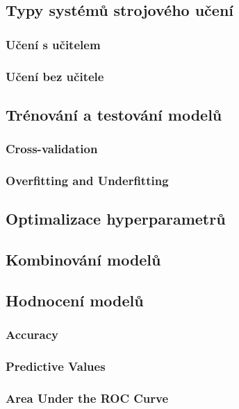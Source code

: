 

\subsection{Typy systémů strojového učení}
\subsubsection{Učení s učitelem}
\subsubsection{Učení bez učitele}

\subsection{Trénování a testování modelů}
\subsubsection{Cross-validation} %
\subsubsection{Overfitting and Underfitting} %

\subsection{Optimalizace hyperparametrů}

\subsection{Kombinování modelů}

\subsection{Hodnocení modelů}
\subsubsection{Accuracy}
\subsubsection{Predictive Values}
\subsubsection{Area Under the ROC Curve}
